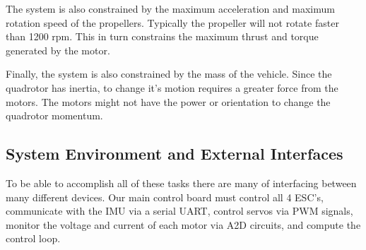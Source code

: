 \documentclass{article}
\numberwithin{equation}{section} %
\begin{document}
The system is also constrained by the maximum acceleration and maximum rotation speed of the propellers. Typically the propeller will not rotate faster than 1200 rpm. This in turn constrains the maximum thrust and torque generated by the motor.

Finally, the system is also constrained by the mass of the vehicle. Since the quadrotor has inertia, to change it's motion requires a greater force from the motors. The motors might not have the power or orientation to change the quadrotor momentum.


\subsection{System Environment and External Interfaces}

To be able to accomplish all of these tasks there are many of interfacing between many different devices. Our main control board must control all 4 ESC's, communicate with the IMU via a serial UART, control servos via PWM signals, monitor the voltage and current of each motor via A2D circuits, and compute the control loop.

\end{document}
